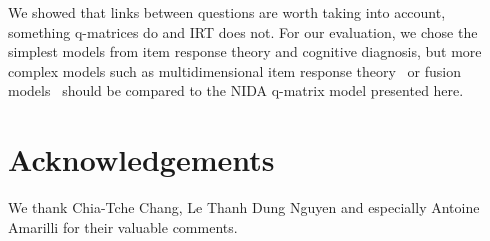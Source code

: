 \documentclass{sig-alternate}
\begin{document}






We showed that links between questions are worth taking into account, something q-matrices do and IRT does not. For our evaluation, we chose the simplest models from item response theory and cognitive diagnosis, but more complex models such as multidimensional item response theory~\citep{Desmarais2012} or fusion models~\citep{McGlohen2008} should be compared to the NIDA q-matrix model presented here.







\section{Acknowledgements}

We thank Chia-Tche Chang, Le Thanh Dung Nguyen and especially Antoine Amarilli for their valuable comments.

%

%
%

\end{document}
